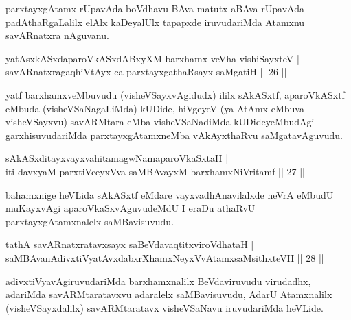 \begin{artha}
parxtayxgAtamx rUpavAda boVdhavu BAva matutx aBAva rUpavAda padAthaRgaLalilx elAlx kaDeyalUlx tapapxde iruvudariMda 
Atamxnu savARnatxra nAguvanu.
\end{artha}


\begin{shl}
yatAsxkASxdaparoVkASxdABxyXM barxhamx veVha vishiSayxteV |\\
savARnatxragaqhiVtAyx ca parxtayxgathaRsayx saMgatiH \hfill || 26 ||
\end{shl}

\begin{artha}
yatf barxhamxveMbuvudu (visheVSayxvAgidudx) ililx sAkASxtf, aparoVkASxtf  eMbuda (visheVSaNagaLiMda) kUDide, hiVgeyeV
(ya AtAmx eMbuva visheVSayxvu) savARMtara eMba visheVSaNadiMda kUDideyeMbudAgi garxhisuvudariMda parxtayxgAtamxneMba vAkAyxthaRvu saMgatavAguvudu. 
\end{artha}


\begin{shl}
sAkASxditayxvayxvahitamagwNamaparoVkaSxtaH |\\
iti davxyaM parxtiVceyxVva saMBAvayxM barxhamxNiVritamf \hfill || 27 ||
\end{shl}

\begin{artha}
bahamxnige heVLida sAkASxtf eMdare vayxvadhAnavilalxde neVrA eMbudU muKayxvAgi aparoVkaSxvAguvudeMdU I eraDu athaRvU parxtayxgAtamxnalelx saMBavisuvudu.
\end{artha}%

\begin{shl}
tathA savARnatxratavxsayx saBeVdavaqtitxviroVdhataH |\\
saMBAvanA\s divxtiVyatAvxdabxrXhamxNeyxVvA\s \s tamxsaMsithxteVH \hfill || 28 ||
\end{shl}

\begin{artha}
adivxtiVyavAgiruvudariMda barxhamxnalilx BeVdaviruvudu virudadhx, adariMda savARMtaratavxvu adaralelx saMBavisuvudu, AdarU Atamxnalilx (visheVSayxdalilx) savARMtaratavx visheVSaNavu iruvudariMda heVLide.
\end{artha}



